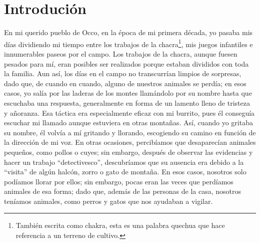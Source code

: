 \cleardoublepage
\newpage
\ifdefined\EnableIncludeImages
\fi
\chapter*{Introdución} %

En mi querido pueblo de Occo, en la época de mi primera década, yo pasaba mis días dividiendo mi tiempo entre los trabajos de la chacra\footnote{También escrita como chakra, esta es una palabra quechua que hace referencia a un terreno de cultivo.}, mis juegos infantiles e innumerables paseos por el campo.
Los trabajos de la chacra, aunque fuesen pesados para mí, eran posibles ser realizados porque estaban divididos con toda la familia. 
Aun así, los días en el campo no transcurrían limpios de sorpresas, dado que, de cuando en cuando, alguno de nuestros animales se perdía; en esos casos, yo salía por las laderas de los montes llamándolo por su nombre hasta que escuchaba una respuesta, generalmente en forma de un lamento lleno de tristeza y añoranza.
Esa táctica era especialmente eficaz con mi burrito, pues él conseguía escuchar mi llamado aunque estuviera en otras montañas. Así, cuando yo gritaba su nombre, él volvía a mí gritando y llorando, escogiendo su camino en función de la dirección de mi voz.  
En otras ocasiones, percibíamos que desaparecían animales pequeños, como pollos o cuyes; sin embargo, después de observar las evidencias y hacer un trabajo ``detectivesco'', descubríamos que su ausencia era debido a la ``visita'' de algún halcón, zorro o gato de montaña.
En esos casos, nosotros solo podíamos llorar por ellos; sin embargo, pocas eran las veces que perdíamos animales de esa forma; dado que, además de las personas de la casa, nosotros teníamos animales, como perros y gatos que nos ayudaban a vigilar.

